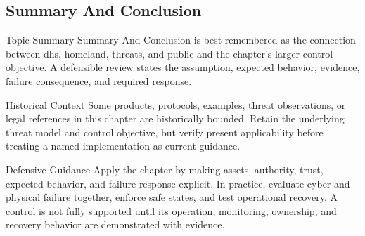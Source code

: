 \documentclass[11pt,letterpaper]{article}
\begin{document}
\subsection*{Summary And Conclusion}
\begin{CornellNotesTable}
\end{CornellNotesTable}
\begin{CornellSummaryBox}{Topic Summary}
Summary And Conclusion is best remembered as the connection between dhs, homeland, threats, and public and the chapter's larger control objective. A defensible review states the assumption, expected behavior, evidence, failure consequence, and required response.
\end{CornellSummaryBox}
\begin{CornellWarningBox}{Historical Context}
Some products, protocols, examples, threat observations, or legal references in this chapter are historically bounded. Retain the underlying threat model and control objective, but verify present applicability before treating a named implementation as current guidance.
\end{CornellWarningBox}
\begin{CornellOverviewBox}{Defensive Guidance}
Apply the chapter by making assets, authority, trust, expected behavior, and failure response explicit. In practice, evaluate cyber and physical failure together, enforce safe states, and test operational recovery. A control is not fully supported until its operation, monitoring, ownership, and recovery behavior are demonstrated with evidence.
\end{CornellOverviewBox}
\end{document}
